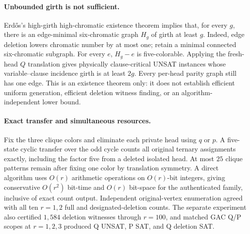 \documentclass[11pt]{article}
\begin{document}
\paragraph{Unbounded girth is not sufficient.}
Erd\H{o}s's high-girth high-chromatic existence theorem
implies that, for every $g$, there is an edge-minimal
six-chromatic graph $H_g$ of girth at least $g$.
Indeed, edge deletion lowers chromatic number by at most one;
retain a minimal connected six-chromatic subgraph.
For every $e$, $H_g-e$ is five-colorable. Applying the
fresh-head $Q$ translation gives physically clause-critical
UNSAT instances whose variable--clause incidence girth
is at least $2g$. Every per-head parity graph still has
one edge. This is an existence theorem only: it does not
establish efficient uniform generation, efficient deletion
witness finding, or an algorithm-independent lower bound.

\paragraph{Exact transfer and simultaneous resources.}
Fix the three clique colors and eliminate each private head
using $q$ or $p$. A five-state cyclic transfer over the
odd cycle counts all original ternary assignments exactly,
including the factor five from a deleted isolated head.
At most $25$ clique patterns remain after fixing one
color by translation symmetry. A direct algorithm uses
$O(r)$ arithmetic operations on $O(r)$-bit integers, giving
conservative $O(r^2)$ bit-time and $O(r)$ bit-space for
the authenticated family, inclusive of exact count output.
Independent original-vertex enumeration agreed with all
ten $r=1,2$ full and designated-deletion counts.
The separate experiment also certified $1{,}584$ deletion
witnesses through $r=100$, and matched GAC Q/P scopes
at $r=1,2,3$ produced Q UNSAT, P SAT, and Q deletion SAT.
\end{document}

